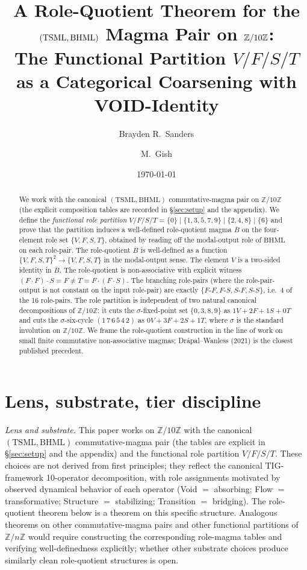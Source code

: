 \documentclass[11pt,reqno]{amsart}
\title[A Role-Quotient Theorem for $(\TS, \BH)$ on $\Z/10\Z$]
{A Role-Quotient Theorem for the $(\TS, \BH)$ Magma Pair on $\Z/10\Z$:\\
The Functional Partition $V/F/S/T$ as a Categorical Coarsening with VOID-Identity}
\author{Brayden R.\ Sanders}
\author{M.\ Gish}
\date{\today}
\theoremstyle{plain}
\theoremstyle{definition}
\theoremstyle{remark}
\newcommand{\Z}{\mathbb{Z}}
\newcommand{\TS}{\mathrm{TSML}}
\newcommand{\BH}{\mathrm{BHML}}
\newcommand{\Bbar}{\overline{B}}
\begin{document}
\begin{abstract}
We work with the canonical $(\TS, \BH)$ commutative-magma pair on
$\Z/10\Z$ (the explicit composition tables are recorded in
\S\ref{sec:setup} and the appendix). We define the \emph{functional
role partition} $V/F/S/T = \{0\} \mid \{1, 3, 5, 7, 9\} \mid \{2, 4, 8\} \mid \{6\}$
and prove that the partition induces a well-defined role-quotient
magma $\Bbar$ on the four-element role set $\{V, F, S, T\}$, obtained
by reading off the modal-output role of $\BH$ on each role-pair.
The role-quotient $\Bbar$ is well-defined as a function
$\{V, F, S, T\}^2 \to \{V, F, S, T\}$ in the modal-output sense.
The element $V$ is a two-sided identity in $\Bbar$. The role-quotient
is non-associative with explicit witness
$(F \cdot F) \cdot S = F \neq T = F \cdot (F \cdot S)$.
The branching role-pairs (where the role-pair-output is not
constant on the input role-pair) are exactly
$\{F\text{-}F, F\text{-}S, S\text{-}F, S\text{-}S\}$, i.e.\ 4 of the
16 role-pairs. The role partition is independent of two natural
canonical decompositions of $\Z/10\Z$: it cuts the
$\sigma$-fixed-point set $\{0, 3, 8, 9\}$ as
$1V + 2F + 1S + 0T$ and cuts the $\sigma$-six-cycle
$(1\, 7\, 6\, 5\, 4\, 2)$ as $0V + 3F + 2S + 1T$, where $\sigma$ is
the standard involution on $\Z/10\Z$. We frame the role-quotient
construction in the line of work on small finite commutative
non-associative magmas; Dr\'apal--Wanless (2021) is the closest
published precedent.
\end{abstract}

\maketitle

\section{Lens, substrate, tier discipline} \label{sec:lens}

\emph{Lens and substrate.} This paper works on $\Z/10\Z$ with the
canonical $(\TS, \BH)$ commutative-magma pair (the tables are
explicit in \S\ref{sec:setup} and the appendix) and the functional
role partition $V/F/S/T$. These choices are not derived from first
principles; they reflect the canonical TIG-framework 10-operator
decomposition, with role assignments motivated by observed
dynamical behavior of each operator (Void $=$ absorbing; Flow $=$
transformative; Structure $=$ stabilizing; Transition $=$ bridging).
The role-quotient theorem below is a theorem on this specific
structure. Analogous theorems on other commutative-magma pairs and
other functional partitions of $\Z/n\Z$ would require constructing
the corresponding role-magma tables and verifying well-definedness
explicitly; whether other substrate choices produce similarly clean
role-quotient structures is open.
\end{document}

